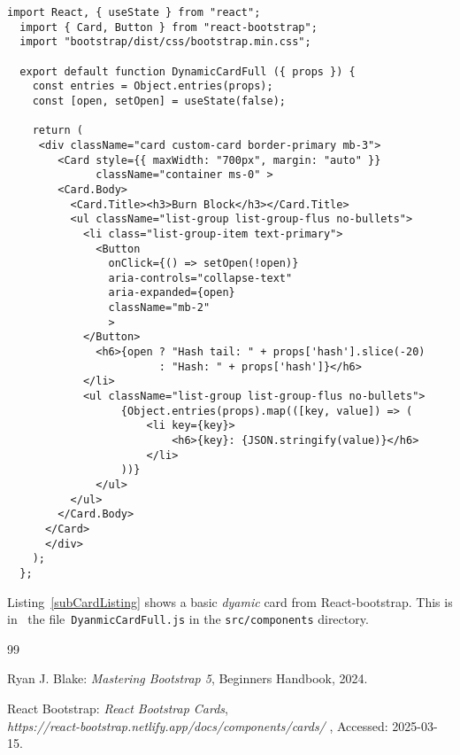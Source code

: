 \documentclass[12pt]{article}
\begin{document}
%
%
\pagebreak
%
%
%
\begin{lstlisting}[label=subCardListing,style=JSES6Base, caption={Basic Dynamic Card from React-bootstrap}]
  import React, { useState } from "react";
  import { Card, Button } from "react-bootstrap";
  import "bootstrap/dist/css/bootstrap.min.css";
  
  export default function DynamicCardFull ({ props }) {
    const entries = Object.entries(props);  
    const [open, setOpen] = useState(false);
  
    return (
     <div className="card custom-card border-primary mb-3">
        <Card style={{ maxWidth: "700px", margin: "auto" }} 
              className="container ms-0" >
        <Card.Body>
          <Card.Title><h3>Burn Block</h3></Card.Title>
          <ul className="list-group list-group-flus no-bullets">
            <li class="list-group-item text-primary">
              <Button
                onClick={() => setOpen(!open)}
                aria-controls="collapse-text"
                aria-expanded={open}
                className="mb-2"
                >
            </Button>
              <h6>{open ? "Hash tail: " + props['hash'].slice(-20) 
                        : "Hash: " + props['hash']}</h6>
            </li>
            <ul className="list-group list-group-flus no-bullets">
                  {Object.entries(props).map(([key, value]) => (
                      <li key={key}>
                          <h6>{key}: {JSON.stringify(value)}</h6>
                      </li>
                  ))}
              </ul>
          </ul>
        </Card.Body>
      </Card>
      </div>
    );
  };
\end{lstlisting}

Listing~\ref{subCardListing} shows a basic {\em dyamic} card from React-bootstrap.
This is in~ the file~\lstinline[language=bash]|DyanmicCardFull.js| in the \lstinline[language=bash]|src/components| directory.




%
%
%
%
\begin {thebibliography}{99}
%



 Ryan J. Blake:
	      {\em Mastering Bootstrap 5},
	     Beginners Handbook,
       2024.

       
 React Bootstrap:
        {\em React Bootstrap Cards},\\
        {\em https://react-bootstrap.netlify.app/docs/components/cards/ },
       Accessed: 2025-03-15.

\end {thebibliography}
\end{document}
